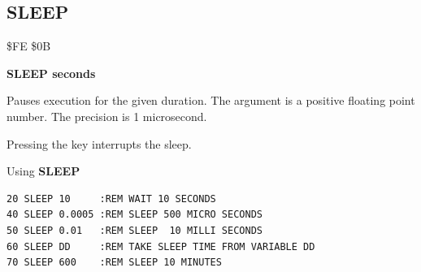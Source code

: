 
\newpage
\subsection{SLEEP}
\begin{description}[leftmargin=2cm,style=nextline]
\item [Token:] \$FE \$0B
\item [Format:] {\bf SLEEP seconds}
\item [Usage:] Pauses execution for the given duration. The argument is a
               positive floating point number.
               The precision is 1 microsecond.
\item [Remarks:] Pressing the  key interrupts the sleep.

\item [Example:] Using {\bf SLEEP}
\begin{tcolorbox}[colback=black,coltext=white]
\verbatimfont{\codefont}
\begin{verbatim}
20 SLEEP 10     :REM WAIT 10 SECONDS
40 SLEEP 0.0005 :REM SLEEP 500 MICRO SECONDS
50 SLEEP 0.01   :REM SLEEP  10 MILLI SECONDS
60 SLEEP DD     :REM TAKE SLEEP TIME FROM VARIABLE DD
70 SLEEP 600    :REM SLEEP 10 MINUTES
\end{verbatim}
\end{tcolorbox}
\end{description}


\newpage
